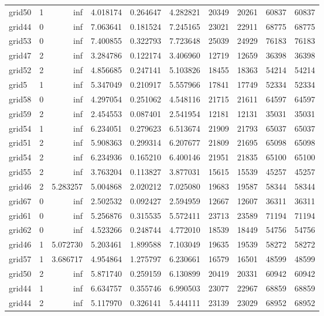 \begin{longtable}{|l|r|r|r|r|r|r|r|r|r|}
grid50 & 1 & inf & 4.018174 & 0.264647 & 4.282821 & 20349 & 20261 & 60837 & 60837 \\
grid44 & 0 & inf & 7.063641 & 0.181524 & 7.245165 & 23021 & 22911 & 68775 & 68775 \\
grid53 & 0 & inf & 7.400855 & 0.322793 & 7.723648 & 25039 & 24929 & 76183 & 76183 \\
grid47 & 2 & inf & 3.284786 & 0.122174 & 3.406960 & 12719 & 12659 & 36398 & 36398 \\
grid52 & 2 & inf & 4.856685 & 0.247141 & 5.103826 & 18455 & 18363 & 54214 & 54214 \\
grid5 & 1 & inf & 5.347049 & 0.210917 & 5.557966 & 17841 & 17749 & 52334 & 52334 \\
grid58 & 0 & inf & 4.297054 & 0.251062 & 4.548116 & 21715 & 21611 & 64597 & 64597 \\
grid59 & 2 & inf & 2.454553 & 0.087401 & 2.541954 & 12181 & 12131 & 35031 & 35031 \\
grid54 & 1 & inf & 6.234051 & 0.279623 & 6.513674 & 21909 & 21793 & 65037 & 65037 \\
grid51 & 2 & inf & 5.908363 & 0.299314 & 6.207677 & 21809 & 21695 & 65098 & 65098 \\
grid54 & 2 & inf & 6.234936 & 0.165210 & 6.400146 & 21951 & 21835 & 65100 & 65100 \\
grid55 & 2 & inf & 3.763204 & 0.113827 & 3.877031 & 15615 & 15539 & 45257 & 45257 \\
grid46 & 2 & 5.283257 & 5.004868 & 2.020212 & 7.025080 & 19683 & 19587 & 58344 & 58344 \\
grid67 & 0 & inf & 2.502532 & 0.092427 & 2.594959 & 12667 & 12607 & 36311 & 36311 \\
grid61 & 0 & inf & 5.256876 & 0.315535 & 5.572411 & 23713 & 23589 & 71194 & 71194 \\
grid62 & 0 & inf & 4.523266 & 0.248744 & 4.772010 & 18539 & 18449 & 54756 & 54756 \\
grid46 & 1 & 5.072730 & 5.203461 & 1.899588 & 7.103049 & 19635 & 19539 & 58272 & 58272 \\
grid57 & 1 & 3.686717 & 4.954864 & 1.275797 & 6.230661 & 16579 & 16501 & 48599 & 48599 \\
grid50 & 2 & inf & 5.871740 & 0.259159 & 6.130899 & 20419 & 20331 & 60942 & 60942 \\
grid44 & 1 & inf & 6.634757 & 0.355746 & 6.990503 & 23077 & 22967 & 68859 & 68859 \\
grid44 & 2 & inf & 5.117970 & 0.326141 & 5.444111 & 23139 & 23029 & 68952 & 68952 \\

\end{longtable}
